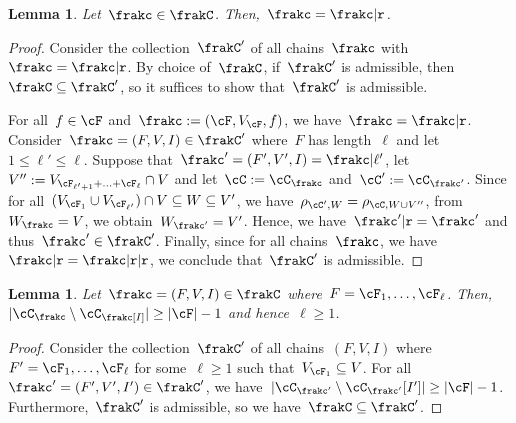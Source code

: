 \documentclass[11pt]{amsart}
\DeclarePairedDelimiter{\abs}{\lvert}{\rvert}
\newcommand{\R}{\text{\normalfont\ttfamily r}}
\newtheorem{lemma}[algocf]{Lemma}
\theoremstyle{definition}
\numberwithin{equation}{section}
\begin{document}
	\begin{lemma}\label{lemma: chains are reduced}
		Let~$\frakc\in\frakC$.
		Then,~$\frakc=\frakc|\R$.
	\end{lemma}
	\begin{proof}
		Consider the collection~$\frakC'$ of all chains~$\frakc$ with~$\frakc=\frakc|\R$.
		By choice of~$\frakC$, if~$\frakC'$ is admissible, then~$\frakC\subseteq\frakC'$, so it suffices to show that~$\frakC'$ is admissible.
		
		For all~$f\in\cF$ and~$\frakc:=(\cF,V_\cF,f)$, we have~$\frakc=\frakc|\R$.
		Consider~$\frakc=(F,V,I)\in\frakC'$ where~$F$ has length~$\ell$ and let~$1\leq \ell'\leq\ell$.
		Suppose that~$\frakc'=(F',V',I)=\frakc|\ell'$, let~$V'':=V_{\cF_{\ell'+1}+\ldots+\cF_\ell}\cap V$ and let~$\cC:=\cC_\frakc$ and~$\cC':=\cC_{\frakc'}$.
		Since for all~$(V_{\cF_1}\cup V_{\cF_{\ell'}})\cap V\subseteq W\subseteq V'$, we have~$\rho_{\cC',W}=\rho_{\cC,W\cup V''}$, from~$W_\frakc=V$, we obtain~$W_{\frakc'}=V'$.
		Hence, we have~$\frakc'|\R=\frakc'$ and thus~$\frakc'\in\frakC'$.
		Finally, since for all chains~$\frakc$, we have~$\frakc|\R=\frakc|\R|\R$, we conclude that~$\frakC'$ is admissible.
	\end{proof}


	\begin{lemma}\label{lemma: chains are not trivial}
		Let~$\frakc=(F,V,I)\in\frakC$ where~$F=\cF_1,\ldots,\cF_\ell$.
		Then,~$\abs{\cC_\frakc\setminus\cC_\frakc[I]}\geq\abs{\cF}-1$ and hence~$\ell\geq 1$.
	\end{lemma}
	\begin{proof}
		Consider the collection~$\frakC'$ of all chains~$(F,V,I)$ where~$F'=\cF_1,\ldots,\cF_\ell$ for some~$\ell\geq 1$ such that~$V_{\cF_1}\subseteq V$.
		For all~$\frakc'=(F',V',I')\in\frakC'$, we have~$\abs{\cC_{\frakc'}\setminus\cC_{\frakc'}[I']}\geq\abs{\cF}-1$.
		Furthermore,~$\frakC'$ is admissible, so we have~$\frakC\subseteq \frakC'$.
	\end{proof}
	
	
\end{document}
